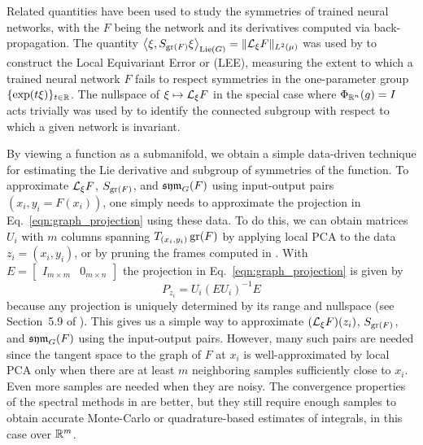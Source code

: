 \documentclass[twoside,11pt]{article}
\begin{document}
Related quantities have been used to study the symmetries of trained neural networks, with the $F$ being the network and its derivatives computed via back-propagation.
The quantity $\left\langle \xi, S_{\operatorname{gr}(F)} \xi \right\rangle_{\operatorname{Lie}(G)} = \Vert {\mathcal{L}}_\xi F \Vert_{L^2(\mu)}$ was used by \citet{Gruver2022Lie} to construct the Local Equivariant Error or (LEE), measuring the extent to which a trained neural network $F$ fails to respect symmetries in the one-parameter group $\{ \exp(t\xi) \}_{t\in\mathbb{R}}$.
The nullspace of $\xi \mapsto {\mathcal{L}}_{\xi} F$ in the special case where $\Phi_{\mathbb{R}^n}(g) = I$ acts trivially was used by \cite{Moskalev2022liegg} to identify the connected subgroup with respect to which a given network is invariant.

By viewing a function as a submanifold, we obtain a simple data-driven technique for estimating the Lie derivative and subgroup of symmetries of the function.
To approximate ${\mathcal{L}}_\xi F$, $S_{\operatorname{gr}(F)}$, and $\operatorname{\mathfrak{sym}}_G(F)$ using input-output pairs $(x_i, y_i=F(x_i))$, one simply needs to approximate the projection in Eq.~\ref{eqn:graph_projection} using these data.
To do this, we can obtain matrices $U_i$ with $m$ columns spanning $T_{(x_i,y_i)} \operatorname{gr}(F)$ by applying local PCA to the data $z_i = (x_i, y_i)$, or by pruning the frames computed in \cite{Berry2020spectral}.
With $E = \begin{bmatrix}
    I_{m\times m} & 0_{m\times n}
\end{bmatrix}$ the projection in Eq.~\ref{eqn:graph_projection} is given by 
\begin{equation}
    P_{z_i} = U_i (E U_i)^{-1} E
\end{equation}
because any projection is uniquely determined by its range and nullspace (see Section~5.9 of \cite{Meyer2000matrix}).
This gives us a simple way to approximate $({\mathcal{L}}_\xi F)(z_i)$, $S_{\operatorname{gr}(F)}$, and $\operatorname{\mathfrak{sym}}_G(F)$ using the input-output pairs.
However, many such pairs are needed since the tangent space to the graph of $F$ at $x_i$ is well-approximated by local PCA only when there are at least $m$ neighboring samples sufficiently close to $x_i$.
Even more samples are needed when they are noisy.
The convergence properties of the spectral methods in \cite{Berry2020spectral} are better, but they still require enough samples to obtain accurate Monte-Carlo or quadrature-based estimates of integrals, in this case over $\mathbb{R}^m$.
\end{document}
